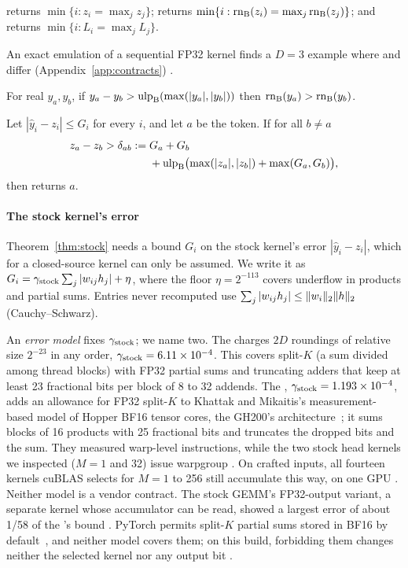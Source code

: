 \begin{definition}\label{def:contracts}
\Rreal{} returns $\min\{i:z_i=\max_jz_j\}$; \Rbf{} returns $\min\{i:\operatorname{rn}_{\mathrm{B}}(z_i)=\max_j\operatorname{rn}_{\mathrm{B}}(z_j)\}$; and \Rstock{} returns $\min\{i:L_i=\max_jL_j\}$.
\end{definition}
An exact emulation of a sequential FP32 kernel finds a \mbox{$D=3$} example where \Rbf{} and \Rstock{} differ (Appendix~\ref{app:contracts}) .

\begin{lemma}[BF16 separation]\label{lem:bf16gap}
For real $y_a,y_b$, if $y_a-y_b>\operatorname{ulp}_{\mathrm{B}}(\max(|y_a|,|y_b|))$ then $\operatorname{rn}_{\mathrm{B}}(y_a)>\operatorname{rn}_{\mathrm{B}}(y_b)$.
\end{lemma}

\begin{theorem}\label{thm:stock}
Let $|\hat y_i-z_i|\le G_i$ for every $i$, and let $a$ be the \Rreal{} token. If for all $b\ne a$
\begin{align*}z_a-z_b>\delta_{ab}:={}&G_a+G_b\\&+\operatorname{ulp}_{\mathrm{B}}\bigl(\max(|z_a|,|z_b|)+\max(G_a,G_b)\bigr),\end{align*}
then \Rstock{} returns $a$.
\end{theorem}

\paragraph{The stock kernel's error} Theorem~\ref{thm:stock} needs a bound $G_i$ on the stock kernel's error $|\hat y_i-z_i|$, which for a closed-source kernel can only be assumed. We write it as $G_i=\gamma_{\rm stock}\sum_j|w_{ij}h_j|+\eta$, where the floor $\eta=2^{-113}$ covers underflow in products and partial sums. Entries never recomputed use $\sum_j|w_{ij}h_j|\le\lVert w_i\rVert_2\lVert h\rVert_2$ (Cauchy--Schwarz).

An \emph{error model} fixes $\gamma_{\rm stock}$; we name two. The \emph{\modelcons} charges $2D$ roundings of relative size $2^{-23}$ in any order, $\gamma_{\rm stock}=6.11\times10^{-4}$. This covers split-$K$ (a sum divided among thread blocks) with FP32 partial sums and truncating adders that keep at least 23 fractional bits per block of 8 to 32 addends. The \emph{\modelhopper}, $\gamma_{\rm stock}=1.193\times10^{-4}$, adds an allowance for FP32 split-$K$ to Khattak and Mikaitis's measurement-based model of Hopper BF16 tensor cores, the GH200's architecture~\cite{khattak2026}; it sums blocks of 16 products with 25 fractional bits and truncates the dropped bits and the sum. They measured warp-level  instructions, while the two stock head kernels we inspected ($M=1$ and 32) issue warpgroup . On crafted inputs, all fourteen kernels cuBLAS selects for $M=1$ to 256 still accumulate this way, on one GPU . Neither model is a vendor contract. The stock GEMM's FP32-output variant, a separate kernel whose accumulator can be read, showed a largest error of about 1/58 of the \modelhopper's bound . PyTorch permits split-$K$ partial sums stored in BF16 by default~\cite{torchnumeric}, and neither model covers them; on this build, forbidding them changes neither the selected kernel nor any output bit .

